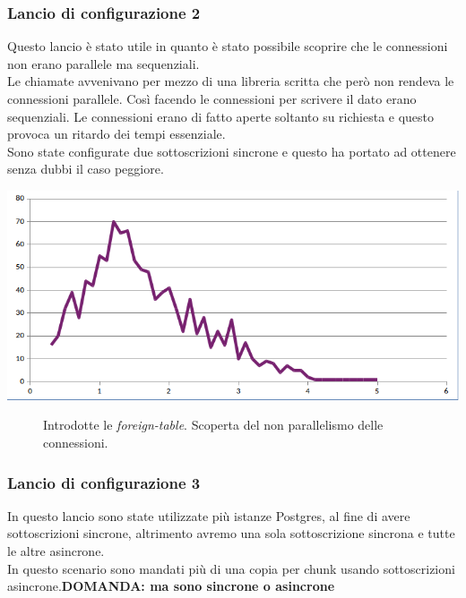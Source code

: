 \item
\subsubsection{Lancio di configurazione 2}
Questo lancio \`{e} stato utile in quanto \`{e} stato possibile scoprire che le connessioni non erano parallele ma sequenziali.\\
Le chiamate avvenivano per mezzo di una libreria scritta che per\`{o} non rendeva le connessioni parallele. Cos\`{i} facendo le connessioni per scrivere il dato erano sequenziali. Le connessioni erano di fatto aperte soltanto su richiesta e questo provoca un ritardo dei tempi essenziale.\\
Sono state configurate due sottoscrizioni sincrone e questo ha portato ad ottenere senza dubbi il caso peggiore.

\begin{center}
\includegraphics[scale=0.70]{img/round1b.png}
\end{center}
\begin{figure}[htbp]
\caption{Introdotte le \textit{foreign-table}. Scoperta del non parallelismo delle connessioni. \label{figura1.15}}
\end{figure}

\item
\subsubsection{Lancio di configurazione 3} 
In questo lancio sono state utilizzate pi\`{u} istanze Postgres, al fine di avere sottoscrizioni sincrone, altrimento avremo una sola sottoscrizione sincrona e tutte le altre asincrone.\\

In questo scenario sono mandati pi\`{u} di una copia per chunk usando sottoscrizioni asincrone.\textbf{DOMANDA: ma sono sincrone o asincrone}

